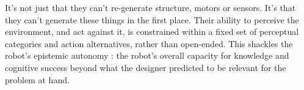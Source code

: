 It's not just that they can't re-generate structure, motors or sensors.
It's that they can't generate these things in the first place.
Their ability to perceive the environment, and act against it, 
is constrained within a fixed set of perceptual categories and action alternatives, rather than open-ended.
This shackles the robot's epistemic autonomy \cite{cariani1993evolve}:
the robot's overall capacity for 
knowledge 
and cognitive success beyond what
the designer predicted to be relevant for the problem at hand.




